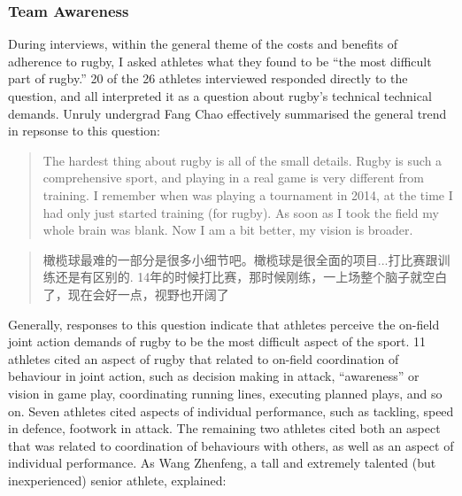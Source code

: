 \begin{CJK}{UTF8}{gbsn}

\subsubsection{Team Awareness}
During interviews, within the general theme of the costs and benefits of adherence to rugby, I asked athletes what they found to be ``the most difficult part of rugby.''  20 of the 26 athletes interviewed responded directly to the question, and all interpreted it as a question about rugby's technical technical demands.  Unruly undergrad Fang Chao effectively summarised the general trend in repsonse to this question:

\begin{quotation}
  The hardest thing about rugby is all of the small details. Rugby is such a comprehensive sport, and playing in a real game is very different from training. I remember when was playing a tournament in 2014, at the time I had only just started training (for rugby).  As soon as I took the field my whole brain was blank.  Now I am a bit better, my vision is broader.
\end{quotation}

\begin{quotation}
  橄榄球最难的一部分是很多小细节吧。橄榄球是很全面的项目...打比赛跟训练还是有区别的. 14年的时候打比赛，那时候刚练，一上场整个脑子就空白了，现在会好一点，视野也开阔了
\end{quotation}

Generally, responses to this question indicate that athletes perceive the on-field joint action demands of rugby to be the most difficult aspect of the sport.  11 athletes cited an aspect of rugby that related to on-field coordination of behaviour in joint action, such as decision making in attack, ``awareness'' or vision in game play, coordinating running lines, executing planned plays, and so on.  Seven athletes cited aspects of individual performance, such as tackling, speed in defence, footwork in attack. The remaining two athletes cited both an aspect that was related to coordination of behaviours with others, as well as an aspect of individual performance.
As Wang Zhenfeng, a tall and extremely talented (but inexperienced) senior athlete, explained:


\end{CJK}
